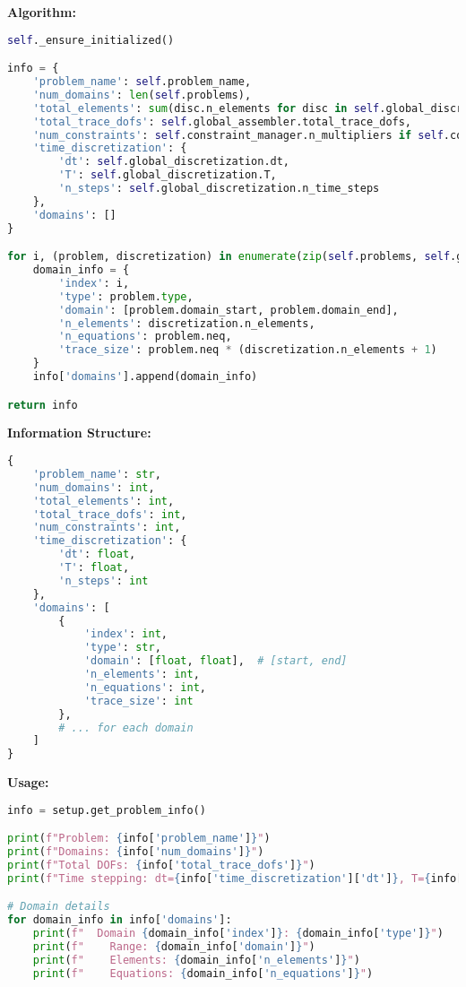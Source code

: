 \textbf{Algorithm:}
\begin{lstlisting}[language=Python, caption=Problem Info Algorithm]
self._ensure_initialized()

info = {
    'problem_name': self.problem_name,
    'num_domains': len(self.problems),
    'total_elements': sum(disc.n_elements for disc in self.global_discretization.spatial_discretizations),
    'total_trace_dofs': self.global_assembler.total_trace_dofs,
    'num_constraints': self.constraint_manager.n_multipliers if self.constraint_manager else 0,
    'time_discretization': {
        'dt': self.global_discretization.dt,
        'T': self.global_discretization.T,
        'n_steps': self.global_discretization.n_time_steps
    },
    'domains': []
}

for i, (problem, discretization) in enumerate(zip(self.problems, self.global_discretization.spatial_discretizations)):
    domain_info = {
        'index': i,
        'type': problem.type,
        'domain': [problem.domain_start, problem.domain_end],
        'n_elements': discretization.n_elements,
        'n_equations': problem.neq,
        'trace_size': problem.neq * (discretization.n_elements + 1)
    }
    info['domains'].append(domain_info)

return info
\end{lstlisting}

\textbf{Information Structure:}
\begin{lstlisting}[language=Python, caption=Problem Info Structure]
{
    'problem_name': str,
    'num_domains': int,
    'total_elements': int,
    'total_trace_dofs': int,
    'num_constraints': int,
    'time_discretization': {
        'dt': float,
        'T': float,
        'n_steps': int
    },
    'domains': [
        {
            'index': int,
            'type': str,
            'domain': [float, float],  # [start, end]
            'n_elements': int,
            'n_equations': int,
            'trace_size': int
        },
        # ... for each domain
    ]
}
\end{lstlisting}

\textbf{Usage:}
\begin{lstlisting}[language=Python, caption=Problem Info Usage]
info = setup.get_problem_info()

print(f"Problem: {info['problem_name']}")
print(f"Domains: {info['num_domains']}")
print(f"Total DOFs: {info['total_trace_dofs']}")
print(f"Time stepping: dt={info['time_discretization']['dt']}, T={info['time_discretization']['T']}")

# Domain details
for domain_info in info['domains']:
    print(f"  Domain {domain_info['index']}: {domain_info['type']}")
    print(f"    Range: {domain_info['domain']}")
    print(f"    Elements: {domain_info['n_elements']}")
    print(f"    Equations: {domain_info['n_equations']}")
\end{lstlisting}

